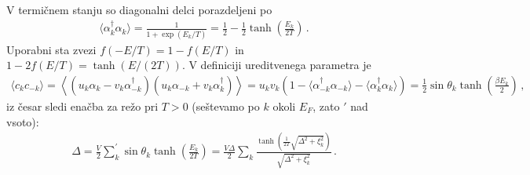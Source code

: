 \documentclass[a4paper,10pt]{article}
\begin{document}
V termičnem stanju so diagonalni delci porazdeljeni po 
\begin{align}
  \langle \alpha_k^\dagger \alpha_k\rangle = \frac{1}{1+ \exp(E_k / T)} = \frac{1}{2}-\frac{1}{2} \tanh\left(\frac{E_k}{2T}\right)\,.
\end{align}
Uporabni sta zvezi $f(-E/T) = 1-f(E/T)$ in $1-2f(E/T) = \tanh(E/(2T))$. V definiciji ureditvenega parametra je 
\begin{align}
  \langle c_k c_{-k} \rangle = \left\langle \left( u_k \alpha_k - v_k \alpha_{-k}^\dagger \right) \left( u_k \alpha_{-k} + v_k \alpha_k^\dagger \right) \right\rangle= u_k v_k \left( 1 - \langle \alpha_{-k}^\dagger \alpha_{-k} \rangle - \langle \alpha_k^\dagger \alpha_k \rangle \right) = \frac{1}{2} \sin\theta_k \tanh\left(\frac{\beta E_k}{2}\right)\,,
\end{align}
iz česar sledi enačba za režo pri $T>0$ (seštevamo po $k$ okoli $E_F$, zato $'$ nad vsoto):
\begin{align}
  \Delta = \frac{V}{2} \sum^{'}_k \sin\theta_k \tanh\left(\frac{E_k}{2T}\right) = \frac{V \Delta}{2} \sum_k \frac{\tanh\left(\frac{1}{2T} \sqrt{\Delta^2 + \xi_k^2}\right)}{\sqrt{\Delta^2 + \xi_k^2}}\,.
\end{align}
\end{document}
